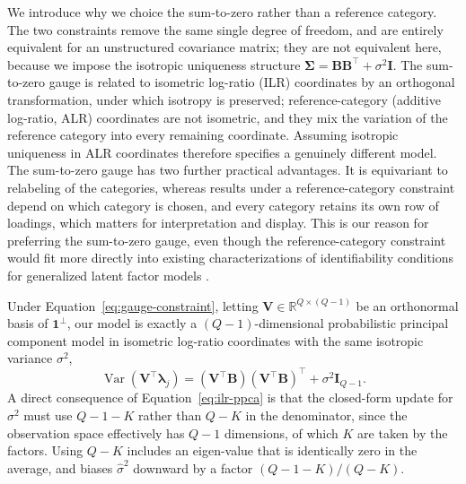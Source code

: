 We introduce why we choice the sum-to-zero rather than a reference category. The two constraints remove the same single degree of freedom, and are entirely equivalent for an unstructured covariance matrix; they are not equivalent here, because we impose the isotropic uniqueness structure $\bm{\Sigma}=\mathbf{B}\mathbf{B}^\top+\sigma^2\mathbf{I}$. The sum-to-zero gauge is related to isometric log-ratio (ILR) coordinates by an orthogonal transformation, under which isotropy is preserved; reference-category (additive log-ratio, ALR) coordinates are not isometric, and they mix the variation of the reference category into every remaining coordinate. Assuming isotropic uniqueness in ALR coordinates therefore specifies a genuinely different model. The sum-to-zero gauge has two further practical advantages. It is equivariant to relabeling of the categories, whereas results under a reference-category constraint depend on which category is chosen, and every category retains its own row of loadings, which matters for interpretation and display. This is our reason for preferring the sum-to-zero gauge, even though the reference-category constraint would fit more directly into existing characterizations of identifiability conditions for generalized latent factor models \citep{Cui2026}.

Under Equation~\eqref{eq:gauge-constraint}, letting $\mathbf{V}\in\mathbb{R}^{Q\times(Q-1)}$ be an orthonormal basis of $\mathbf{1}^\perp$, our model is exactly a $(Q-1)$-dimensional probabilistic principal component model in isometric log-ratio coordinates with the same isotropic variance $\sigma^2$,
\begin{equation}
\operatorname{Var}(\mathbf{V}^\top\bm{\lambda}_j)=(\mathbf{V}^\top\mathbf{B})(\mathbf{V}^\top\mathbf{B})^\top+\sigma^2\mathbf{I}_{Q-1}.
\label{eq:ilr-ppca}
\end{equation}
A direct consequence of Equation~\eqref{eq:ilr-ppca} is that the closed-form update for $\sigma^2$ must use $Q-1-K$ rather than $Q-K$ in the denominator, since the observation space effectively has $Q-1$ dimensions, of which $K$ are taken by the factors. Using $Q-K$ includes an eigen-value that is identically zero in the average, and biases $\hat\sigma^2$ downward by a factor $(Q-1-K)/(Q-K)$. 

